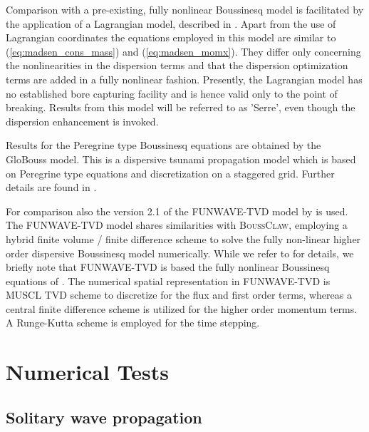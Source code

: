 \documentclass[review]{elsarticle}
\begin{document}
Comparison with a pre-existing, fully nonlinear Boussinesq model is
facilitated by the application of a Lagrangian model, described
in \citet{Lovholt:2013a}. Apart from the use of
Lagrangian coordinates the equations employed in this model are
 similar to (\ref{eq:madsen_cons_mass}) and (\ref{eq:madsen_momx}).
They differ only concerning the nonlinearities in the
dispersion terms and that  the dispersion optimization terms are added in a fully nonlinear fashion.
Presently, the Lagrangian model has no established bore capturing 
facility and is hence valid only to the point of breaking.
Results from this model will be referred to as 'Serre', even though
the dispersion enhancement is invoked. 
 
Results for the Peregrine type Boussinesq equations are obtained by the
GloBouss model. This is a dispersive tsunami propagation model which
is based on Peregrine type equations and discretization on a staggered grid. Further details are found in 
\citet{Lovholt:2008b}.

For comparison also the version 2.1 of the FUNWAVE-TVD model
by \citep{shi2012high} is used. The
FUNWAVE-TVD model shares similarities with \textsc{BoussClaw}, employing a hybrid finite volume / finite difference
scheme to solve the fully non-linear higher order dispersive Boussinesq model numerically.
While we refer to \citep{shi2012high} for details, we briefly note that FUNWAVE-TVD is based the fully nonlinear 
Boussinesq equations of \citep{Chen06}. The numerical spatial representation in FUNWAVE-TVD is MUSCL TVD scheme 
to discretize for the flux and first order terms, whereas a central finite difference
scheme \cite{Wei95} is utilized for the higher order momentum terms. A Runge-Kutta scheme is employed for the time stepping.

\section{Numerical Tests}
\label{sec:num_nonbreaking}

\subsection{Solitary wave propagation}
\end{document}

